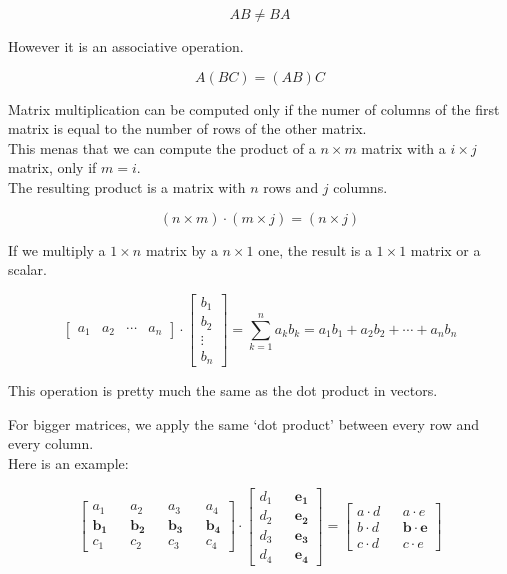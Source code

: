 \documentclass{article}
\begin{document}
\[
    AB\neq BA
\]

However it is an associative operation.

\[
    A(BC)=(AB)C
\]

Matrix multiplication can be computed only if the numer of columns of the first matrix is equal to the number of rows of the other matrix. \\
This menas that we can compute the product of a \(n \times m\) matrix with a \(i \times j\) matrix, only if \(m=i\). \\
The resulting product is a matrix with \(n\) rows and \(j\) columns.

\[
    (n \times m) \cdot (m \times j) = (n \times j)
\]

If we multiply a \(1 \times n\) matrix by a \(n \times 1\) one, the result is a \(1 \times 1\) matrix or a scalar.

\[
    \begin{bmatrix} 
        a_1 & a_2 & \cdots & a_n
    \end{bmatrix}
    \cdot
    \begin{bmatrix} 
        b_1 \\
        b_2 \\
        \vdots \\
        b_n
    \end{bmatrix}
    = \sum_{k=1}^{n} a_k b_k = a_1 b_1 + a_2 b_2 + \cdots + a_n b_n
\]

This operation is pretty much the same as the dot product in vectors.

For bigger matrices, we apply the same `dot product' between every row and every column. \\
Here is an example:

\[
    \begin{bmatrix} 
        a_1 && a_2 && a_3 && a_4 \\
        \mathbf{b_1} && \mathbf{b_2} && \mathbf{b_3} && \mathbf{b_4} \\
        c_1 && c_2 && c_3 && c_4
    \end{bmatrix}
    \cdot
    \begin{bmatrix} 
        d_1 && \mathbf{e_1} \\
        d_2 && \mathbf{e_2} \\
        d_3 && \mathbf{e_3} \\
        d_4 && \mathbf{e_4}
    \end{bmatrix}
    =
    \begin{bmatrix} 
        a \cdot d && a \cdot e \\
        b \cdot d && \mathbf{b \cdot e} \\
        c \cdot d && c \cdot e
    \end{bmatrix}
\]
\end{document}
